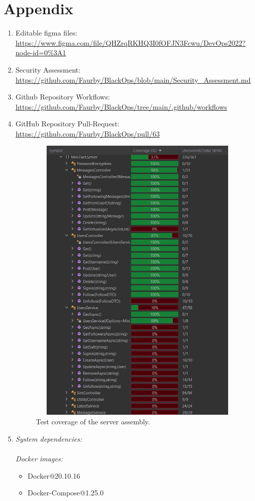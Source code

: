 \section{Appendix}
\label{sec:mpt}

\begin{enumerate}
    \item Editable figma files: \\
    \url{https://www.figma.com/file/QHZrqRKHQ3I0fOFJN3Fcwu/DevOps2022?node-id=0\%3A1}
    \item Security Assessment: \\
    \url{https://github.com/Faurby/BlackOps/blob/main/Security_Assessment.md}
    \item Github Repository Workflows: \\    \url{https://github.com/Faurby/BlackOps/tree/main/.github/workflows}
    \item GitHub Repository Pull-Request:\\
    \url{https://github.com/Faurby/BlackOps/pull/63}
    \begin{figure}[H]
    \centering
    \includegraphics[width=16cm,height=14cm,keepaspectratio]{images/test coverage server.jpg}
    \caption{Test coverage of the server assembly.}
    \label{ServerAssembly}
    \end{figure}
    \item \textit{System dependencies:}\\\\
    \textit{Docker images:}
    \begin{itemize}
        \item Docker@20.10.16
        \item Docker-Compose@1.25.0
    

\end{itemize}
\end{enumerate}
